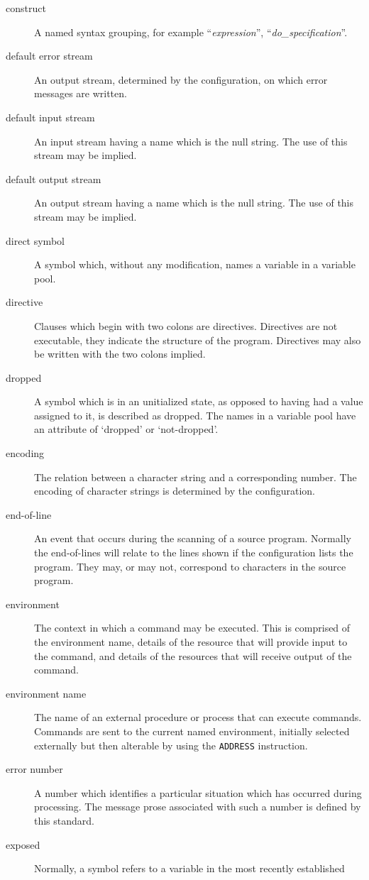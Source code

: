 \begin{description}
\item[construct]
A named syntax grouping, for example ``\emph{expression}'',
``\emph{do\_specification}''.
\item[default error stream]
An output stream, determined by the configuration, on which error
messages are written.
\item[default input stream]
An input stream having a name which is the null string. The use of this
stream may be implied.
\item[default output stream]
An output stream having a name which is the null string. The use of this
stream may be implied.
\item[direct symbol]
A symbol which, without any modification, names a variable in a variable
pool.
\item[directive]
Clauses which begin with two colons are directives. Directives are not
executable, they indicate the structure of the program. Directives may
also be written with the two colons implied.
\item[dropped]
A symbol which is in an unitialized state, as opposed to having had a
value assigned to it, is described as dropped. The names in a variable
pool have an attribute of `dropped' or `not-dropped'.
\item[encoding]
The relation between a character string and a corresponding number. The
encoding of character strings is determined by the configuration.
\item[end-of-line]
An event that occurs during the scanning of a source program. Normally
the end-of-lines will relate to the lines shown if the configuration
lists the program. They may, or may not, correspond to characters in the
source program.
\item[environment]
The context in which a command may be executed. This is comprised of the
environment name, details of the resource that will provide input to the
command, and details of the resources that will receive output of the
command.
\item[environment name]
The name of an external procedure or process that can execute commands.
Commands are sent to the current named environment, initially selected
externally but then alterable by using the \texttt{ADDRESS} instruction.
\item[error number]
A number which identifies a particular situation which has occurred
during processing. The message prose associated with such a number is
defined by this standard.
\item[exposed]
Normally, a symbol refers to a variable in the most recently established

\end{description}
